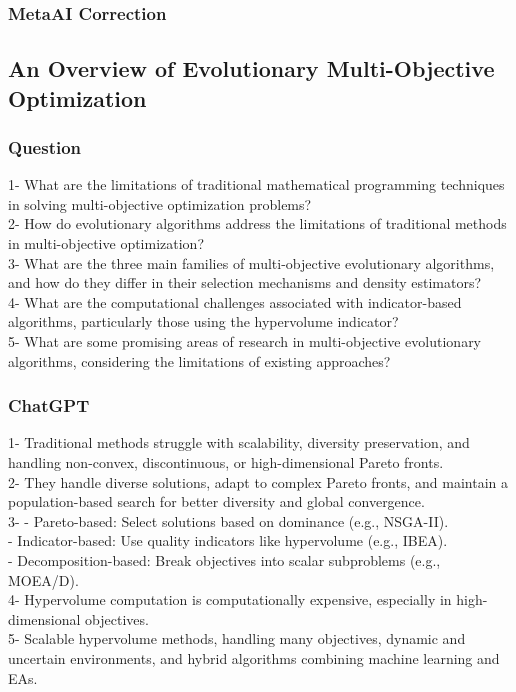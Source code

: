 \subsubsection{MetaAI Correction}
\begin{tcolorbox}[breakable]
    
\end{tcolorbox}


\subsection{An Overview of Evolutionary Multi-Objective Optimization}
\subsubsection{Question}
\begin{tcolorbox}[breakable]
    1- What are the limitations of traditional mathematical programming techniques in solving multi-objective optimization problems?\\
2- How do evolutionary algorithms address the limitations of traditional methods in multi-objective optimization?\\
3- What are the three main families of multi-objective evolutionary algorithms, and how do they differ in their selection mechanisms and density estimators?\\
4- What are the computational challenges associated with indicator-based algorithms, particularly those using the hypervolume indicator?\\
5- What are some promising areas of research in multi-objective evolutionary algorithms, considering the limitations of existing approaches?\\

\end{tcolorbox}
\subsubsection{ChatGPT}
\begin{tcolorbox}[breakable]
    1- Traditional methods struggle with scalability, diversity preservation, and handling non-convex, discontinuous, or high-dimensional Pareto fronts.\\
2- They handle diverse solutions, adapt to complex Pareto fronts, and maintain a population-based search for better diversity and global convergence.\\
3-
   - Pareto-based: Select solutions based on dominance (e.g., NSGA-II).\\
   - Indicator-based: Use quality indicators like hypervolume (e.g., IBEA).\\
   - Decomposition-based: Break objectives into scalar subproblems (e.g., MOEA/D).\\

4- Hypervolume computation is computationally expensive, especially in high-dimensional objectives.\\
5- Scalable hypervolume methods, handling many objectives, dynamic and uncertain environments, and hybrid algorithms combining machine learning and EAs.\\

\end{tcolorbox}
